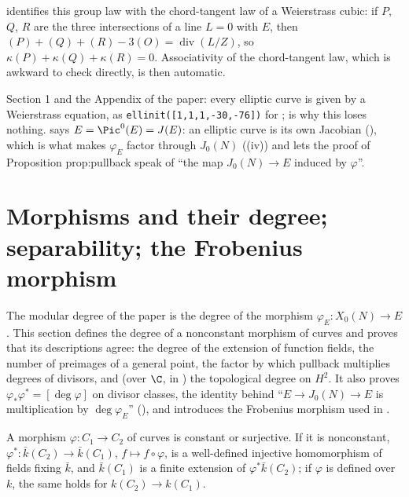  identifies this group law with the chord-tangent law of a Weierstrass cubic: if $P$, $Q$, $R$ are the three intersections of a line
$L=0$ with $E$, then $(P)+(Q)+(R)-3(O)=\operatorname{div}(L/Z)$, so $\kappa(P)+\kappa(Q)+\kappa(R)=0$. Associativity of the chord-tangent law, which is awkward to check
directly, is then automatic.

\begin{paperlink}\label{pl:curves:weierstrass}
Section 1 and the Appendix of the paper: every elliptic curve is given by a Weierstrass equation, as \texttt{ellinit([1,1,1,-30,-76])} for
;  is why this loses nothing.  says $E=\Pic^0(E)=J(E)$: an elliptic curve
is its own Jacobian (), which is what makes $\varphi_E$ factor through $J_0(N)$ ((iv)) and
lets the proof of Proposition prop:pullback speak of ``the map $J_0(N)\to E$ induced by $\varphi$''.
\end{paperlink}

\section[Morphisms and their degree; the Frobenius morphism]{Morphisms and their degree; separability; the Frobenius morphism}\label{sec:curves:morphisms}

The modular degree of the paper is the degree of the morphism $\varphi_E\colon X_0(N)\to E$. This section defines the degree of a nonconstant
morphism of curves and proves that its descriptions agree: the degree of the extension of function fields, the number of preimages of a general
point, the factor by which pullback multiplies degrees of divisors, and (over $\C$, in ) the
topological degree on $H^2$. It also proves $\varphi_*\varphi^*=[\deg\varphi]$ on divisor classes, the identity behind ``$E\to J_0(N)\to E$ is multiplication by
$\deg\varphi_E$'' (), and introduces the Frobenius morphism used in .

\begin{theorem}\label{thm:curves:constant-or-surjective}
A morphism $\varphi\colon C_1\to C_2$ of curves is constant or surjective. If it is nonconstant, $\varphi^*\colon\bar k(C_2)\to\bar k(C_1)$, $f\mapsto f\circ\varphi$, is a
well-defined injective homomorphism of fields fixing $\bar k$, and $\bar k(C_1)$ is a finite extension of $\varphi^*\bar k(C_2)$; if $\varphi$ is defined over $k$, the same
holds for $k(C_2)\to k(C_1)$.
\end{theorem}

